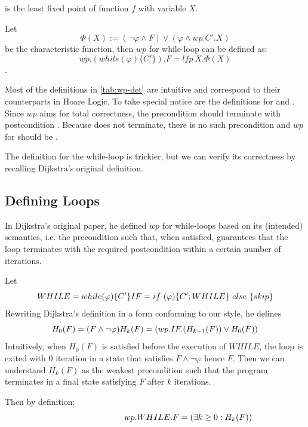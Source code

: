  is the least fixed point of function $f$ with variable $X$. 

Let {$$\Phi(X):=(\neg\varphi\wedge F)\vee(\varphi\wedge wp.C'.X)$$} be the characteristic function, then $wp$ for while-loop can be defined as: 
{$$wp.(while(\varphi)\{C'\}).F = lfp\ X. \Phi(X)$$}. 

Most of the definitions in \autoref{tab:wp-det} are intuitive and correspond to their counterparts in Hoare Logic.
To take special notice are the definitions for  and . 
Since $wp$ aims for total correctness, the precondition  should terminate with postcondition . 
Because  does not terminate, there is no such precondition and $wp$ for  should be . 

The definition for the while-loop\cite{kaminski19} is trickier, but we can verify its correctness by recalling Dijkstra's original definition. 


\subsection{Defining Loops}
In Dijkstra's original paper\cite{dijkstra75}, he defined $wp$ for while-loops based on its (intended) semantics, i.e. the precondition such that, when satisfied, guarantees that the loop terminates with the required postcondition within a certain number of iterations. 

Let 
\[
WHILE=while(\varphi)\{C'\}
\\ 
IF=  if\ (\varphi)\{C';WHILE\}\ else\ \{skip\}
\] 
Rewriting Dijkstra's definition in a form conforming to our style, he defines 
\[
H_0(F)=(F \wedge \neg \varphi )
\\
H_k(F)=(wp.IF.(H_{k-1}(F)) \vee H_0(F))
\]
Intuitively, when $H_0(F)$ is satisfied before the execution of $WHILE$, the loop is exited with 0 iteration in a state that satisfies $F\wedge\neg\varphi$ hence $F$. 
Then we can understand $H_k(F)$ as the weakest precondition such that the program terminates in a final state satisfying $F$ after  $k$ iterations. 

Then by definition: 
\begin{equation}
\hspace{2.8cm} wp.WHILE.F=(\exists k\geq 0: H_k(F))  \label{eq:while}
\end{equation}



